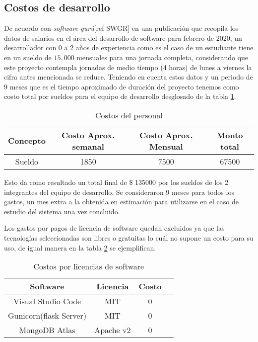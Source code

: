\subsection{Costos de desarrollo}

De acuerdo con \textit{software gurú}[ref SWGR] en una publicación que recopila los datos de salarios en el área del desarrollo de software para febrero de 2020, un desarrollador con 0 a 2 años de experiencia como es el caso de un estudiante tiene en un sueldo de $15,000$ mensuales para una jornada completa, considerando que este proyecto contempla jornadas de medio tiempo (4 horas) de lunes a viernes la cifra antes mencionada se reduce. Teniendo en cuenta estos datos y un periodo de 9 meses que es el tiempo aproximado de duración del proyecto tenemos como costo total por sueldos para el equipo de desarrollo desglosado de la tabla \ref{tab:devs_salary}.

\begin{table}[h!]
    \centering
    \begin{tabular}{|c|c|c|c|}
    \hline
        Concepto & Costo Aprox. semanal & Costo Aprox. Mensual & Monto total \\ \hline
        Sueldo & 1850 & 7500 & 67500 \\ \hline
    \end{tabular}
    \caption{Costos del personal}
    \label{tab:devs_salary}
\end{table}


Esto da como resultado un total final de \$ 135000 por los sueldos de los 2 integrantes del equipo de desarrollo. Se consideraron 9 meses para todos los gastos, un mes extra a la obtenida en estimación para utilizarse en el caso de estudio del sistema una vez concluido.

Los gastos por pagos de licencia de software quedan excluidos ya que las tecnologías seleccionadas son libres o gratuitas lo cuál no supone un costo para su uso, de igual manera en la tabla \ref{tab:sw_licences} se ejemplifican.

\begin{table}
    \centering
    \begin{tabular}{|c|c|c|c|}
    \hline
        Software & Licencia & Costo \\ \hline
        Visual Studio Code  & MIT & 0  \\ \hline
        Gunicorn(flask Server) & MIT & 0 \\ \hline
        MongoDB Atlas & Apache v2 & 0 \\ \hline
    \end{tabular}
    \caption{Costos por licencias de software}
    \label{tab:sw_licences}
\end{table}

